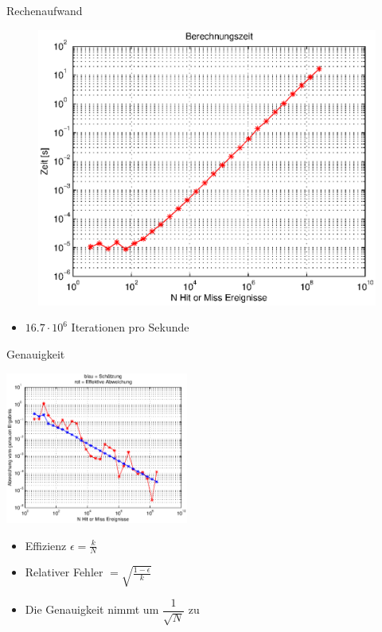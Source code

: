 \documentclass{beamer}
\begin{document}
\begin{frame}{Rechenaufwand}
\begin{figure}[h]
		\centering
		\includegraphics[width=0.7\linewidth]{images/Berechnungszeit.eps}
	\end{figure}
	\begin{itemize}
	\item<1-> $16.7 \cdot 10^6$ Iterationen pro Sekunde
	\end{itemize}
\end{frame}
\begin{frame}{Genauigkeit}
	\begin{minipage}{6cm}
		\includegraphics[width=6cm]{images/Fehler.eps}
	\end{minipage}
	\begin{minipage}{4cm}
		\begin{itemize}
			\item<1-> Effizienz $\epsilon = \frac{k}{N}$
			\item<1->Relativer Fehler $= \sqrt{\frac{1-\epsilon}{k}}$
			\item<1-> Die Genauigkeit nimmt um $\dfrac{1}{\sqrt{N}}$ zu
		\end{itemize}
	\end{minipage}
\end{frame}
\end{document}
